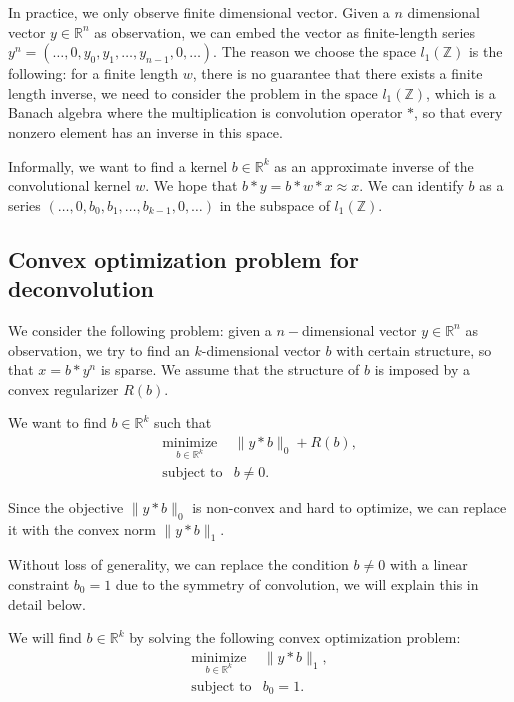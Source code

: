 \documentclass[letter, 10pt]{article}
\numberwithin{equation}{section}
\begin{document}
In practice, we only observe finite dimensional vector. Given a $n$ dimensional vector $ y\in \mathbb{R}^n$ as observation, we can embed the vector as finite-length series $y^n = (\ldots, 0, y_0, y_1, \ldots, y_{n-1}, 0, \ldots)$. The reason we choose the space $l_1( \mathbb{Z})$ is the following: for a finite length $w$, there is no guarantee that there exists a finite length inverse, we need to consider the problem in the space $l_1( \mathbb{Z})$, which is a Banach algebra where the multiplication is convolution operator $*$, so that every nonzero element has an inverse in this space. 

Informally, we want to find a kernel $b\in \mathbb{R}^k$ as an approximate inverse of the convolutional kernel $w$. We hope that $b*y = b*w*x \approx x$. We can identify $b$ as a series $(\ldots, 0, b_0, b_1, \ldots, b_{k-1}, 0, \ldots)$ in the subspace of $ l_1(\mathbb{Z})$. 

\subsection{Convex optimization problem for deconvolution}
We consider the following problem: given a $n-$dimensional vector $ y\in \mathbb{R}^n$ as observation, we try to find an $k$-dimensional vector $b$ with certain structure, so that $x = b*y^n$ is sparse. We assume that the structure of $b$ is imposed by a convex regularizer $R(b)$.

We want to find $b \in \mathbb{R}^k$ such that 
 \begin{eqnarray*}
\underset{b\in \mathbb{R}^k}{\mbox{minimize}}& \|y*b\|_0+R(b) ,\\
\mbox{subject to}& b \neq 0.
 \end{eqnarray*}

Since the objective $\|y*b\|_0$ is non-convex and hard to optimize, we can replace it with the convex norm $\|y*b\|_1$. 

Without loss of generality, we can replace the condition $b \neq 0$ with a linear constraint 
$b_0 =1$ due to the symmetry of convolution, we will explain this in detail below.

We will find $b \in \mathbb{R}^k$ by solving  the following convex optimization problem:
 \begin{eqnarray*}
\underset{b\in \mathbb{R}^k}{\mbox{minimize}}& \|y*b\|_1 ,\\
\mbox{subject to}& b_0 =1.
 \end{eqnarray*}
 
\end{document}
